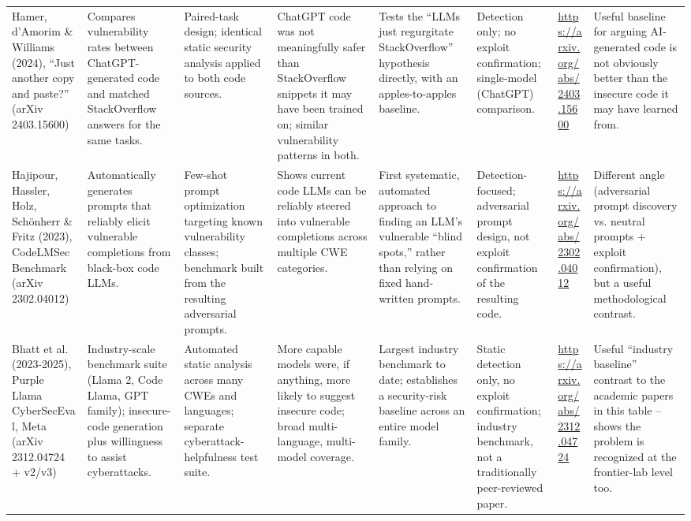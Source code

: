 \documentclass[10pt]{article}
\begin{document}
\begin{landscape}
\begin{longtable}{
  P{2.6cm}
  P{3.6cm}
  P{3.2cm}
  P{4.0cm}
  P{3.0cm}
  P{3.0cm}
  P{2.2cm}
  P{3.6cm}
}
Hamer, d'Amorim \& Williams (2024), ``Just another copy and paste?'' (arXiv 2403.15600)
&
Compares vulnerability rates between ChatGPT-generated code and matched StackOverflow answers for the same tasks.
&
Paired-task design; identical static security analysis applied to both code sources.
&
ChatGPT code was not meaningfully safer than StackOverflow snippets it may have been trained on; similar vulnerability patterns in both.
&
Tests the ``LLMs just regurgitate StackOverflow'' hypothesis directly, with an apples-to-apples baseline.
&
Detection only; no exploit confirmation; single-model (ChatGPT) comparison.
&
\url{https://arxiv.org/abs/2403.15600}
&
Useful baseline for arguing AI-generated code is not obviously better than the insecure code it may have learned from.
\\[4pt]

Hajipour, Hassler, Holz, Sch\"onherr \& Fritz (2023), CodeLMSec Benchmark (arXiv 2302.04012)
&
Automatically generates prompts that reliably elicit vulnerable completions from black-box code LLMs.
&
Few-shot prompt optimization targeting known vulnerability classes; benchmark built from the resulting adversarial prompts.
&
Shows current code LLMs can be reliably steered into vulnerable completions across multiple CWE categories.
&
First systematic, automated approach to finding an LLM's vulnerable ``blind spots,'' rather than relying on fixed hand-written prompts.
&
Detection-focused; adversarial prompt design, not exploit confirmation of the resulting code.
&
\url{https://arxiv.org/abs/2302.04012}
&
Different angle (adversarial prompt discovery vs. neutral prompts + exploit confirmation), but a useful methodological contrast.
\\[4pt]

Bhatt et al. (2023-2025), Purple Llama CyberSecEval, Meta (arXiv 2312.04724 + v2/v3)
&
Industry-scale benchmark suite (Llama 2, Code Llama, GPT family); insecure-code generation plus willingness to assist cyberattacks.
&
Automated static analysis across many CWEs and languages; separate cyberattack-helpfulness test suite.
&
More capable models were, if anything, more likely to suggest insecure code; broad multi-language, multi-model coverage.
&
Largest industry benchmark to date; establishes a security-risk baseline across an entire model family.
&
Static detection only, no exploit confirmation; industry benchmark, not a traditionally peer-reviewed paper.
&
\url{https://arxiv.org/abs/2312.04724}
&
Useful ``industry baseline'' contrast to the academic papers in this table -- shows the problem is recognized at the frontier-lab level too.
\\[4pt]


\end{longtable}
\end{landscape}
\end{document}
